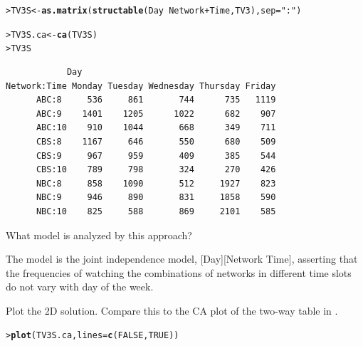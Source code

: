 \documentclass[10pt]{report}\usepackage[]{graphicx}\usepackage[]{color}
\makeatletter
\newcommand{\hlnum}[1]{\textcolor[rgb]{0.686,0.059,0.569}{#1}}%
\newcommand{\hlstr}[1]{\textcolor[rgb]{0.192,0.494,0.8}{#1}}%
\newcommand{\hlopt}[1]{\textcolor[rgb]{0,0,0}{#1}}%
\newcommand{\hlstd}[1]{\textcolor[rgb]{0.345,0.345,0.345}{#1}}%
\newcommand{\hlkwb}[1]{\textcolor[rgb]{0.69,0.353,0.396}{#1}}%
\newcommand{\hlkwc}[1]{\textcolor[rgb]{0.333,0.667,0.333}{#1}}%
\newcommand{\hlkwd}[1]{\textcolor[rgb]{0.737,0.353,0.396}{\textbf{#1}}}%
\newenvironment{kframe}{%
 \def\at@end@of@kframe{}%
 \ifinner\ifhmode%
  \def\at@end@of@kframe{\end{minipage}}%
  \begin{minipage}{\columnwidth}%
 \fi\fi%
 \def\FrameCommand##1{\hskip\@totalleftmargin \hskip-\fboxsep
 \colorbox{shadecolor}{##1}\hskip-\fboxsep
     \hskip-\linewidth \hskip-\@totalleftmargin \hskip\columnwidth}%
 \MakeFramed {\advance\hsize-\width
   \@totalleftmargin\z@ \linewidth\hsize
   \@setminipage}}%
 {\par\unskip\endMakeFramed%
 \at@end@of@kframe}
\newenvironment{knitrout}{}{} %
\renewenvironment{knitrout}{\small\renewcommand{\baselinestretch}{.85}}{} %
\makeatother
\begin{document}
\begin{Exercises}
\begin{enumerate*}
\begin{knitrout}
\begin{kframe}
\begin{alltt}
\hlstd{> }\hlstd{TV3S} \hlkwb{<-} \hlkwd{as.matrix}\hlstd{(}\hlkwd{structable}\hlstd{(Day} \hlopt{~} \hlstd{Network} \hlopt{+} \hlstd{Time, TV3),} \hlkwc{sep}\hlstd{=}\hlstr{":"}\hlstd{)}
\end{alltt}
\end{kframe}
\end{knitrout}
		\begin{ans}
\begin{knitrout}\footnotesize
{}\color{fgcolor}\begin{kframe}
\begin{alltt}
\hlstd{> }\hlstd{TV3S.ca} \hlkwb{<-}\hlkwd{ca}\hlstd{(TV3S)}
\hlstd{> }\hlstd{TV3S}
\end{alltt}
\begin{verbatim}
            Day
Network:Time Monday Tuesday Wednesday Thursday Friday
      ABC:8     536     861       744      735   1119
      ABC:9    1401    1205      1022      682    907
      ABC:10    910    1044       668      349    711
      CBS:8    1167     646       550      680    509
      CBS:9     967     959       409      385    544
      CBS:10    789     798       324      270    426
      NBC:8     858    1090       512     1927    823
      NBC:9     946     890       831     1858    590
      NBC:10    825     588       869     2101    585
\end{verbatim}
\end{kframe}
\end{knitrout}
		\end{ans}

    \item What \loglin model is analyzed by this approach?
    \begin{ans}
    The model is the joint independence model, [Day][Network Time], asserting that 
    the frequencies of watching the combinations of networks in different time
    slots do not vary with day of the week.
    \end{ans}
    
    \item Plot the 2D solution.  Compare this to the CA plot of the two-way table in .
    \begin{ans}
\begin{knitrout}\footnotesize
{}\color{fgcolor}\begin{kframe}
\begin{alltt}
\hlstd{> }\hlkwd{plot}\hlstd{(TV3S.ca,} \hlkwc{lines}\hlstd{=}\hlkwd{c}\hlstd{(}\hlnum{FALSE}\hlstd{,} \hlnum{TRUE}\hlstd{))}
\end{alltt}
\end{kframe}


\end{knitrout}
\end{ans}
\end{enumerate*}
\end{Exercises}
\end{document}
